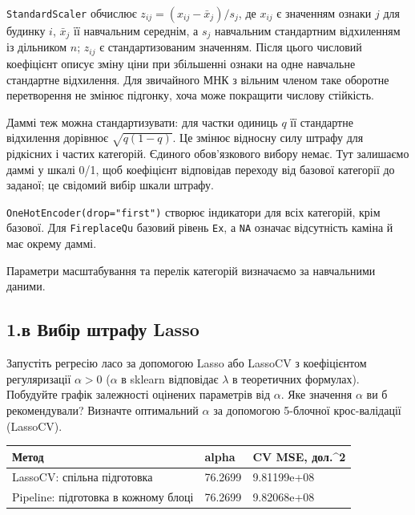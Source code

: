 \texttt{StandardScaler} обчислює \(z_{ij}=(x_{ij}-\bar x_j)/s_j\), де
\(x_{ij}\) є значенням ознаки \(j\) для будинку \(i\), \(\bar x_j\) її
навчальним середнім, а \(s_j\) навчальним стандартним відхиленням із
дільником \(n\); \(z_{ij}\) є стандартизованим значенням. Після цього
числовий коефіцієнт описує зміну ціни при збільшенні ознаки на одне
навчальне стандартне відхилення. Для звичайного МНК з вільним членом
таке оборотне перетворення не змінює підгонку, хоча може покращити
числову стійкість.

Даммі теж можна стандартизувати: для частки одиниць \(q\) її стандартне
відхилення дорівнює \(\sqrt{q(1-q)}\). Це змінює відносну силу штрафу
для рідкісних і частих категорій. Єдиного обов'язкового вибору немає.
Тут залишаємо даммі у шкалі 0/1, щоб коефіцієнт відповідав переходу від
базової категорії до заданої; це свідомий вибір шкали штрафу.

\texttt{OneHotEncoder(drop="first")} створює індикатори для всіх
категорій, крім базової. Для \texttt{FireplaceQu} базовий рівень
\texttt{Ex}, а \texttt{NA} означає відсутність каміна й має окрему
даммі.

Параметри масштабування та перелік категорій визначаємо за навчальними
даними.


\Needspace{411pt}

\subsection{1.в Вибір штрафу Lasso}

\begin{taskstatement}Запустіть регресію ласо за допомогою Lasso або LassoCV з коефіцієнтом
регуляризації \(\alpha > 0\) (\(\alpha\) в sklearn відповідає
\(\lambda\) в теоретичних формулах). Побудуйте графік залежності
оцінених параметрів від \(\alpha\). Яке значення \(\alpha\) ви б
рекомендували? Визначте оптимальний \(\alpha\) за допомогою 5-блочної
крос-валідації (LassoCV).
\end{taskstatement}


\Needspace{56pt}
\begingroup\fontsize{7.5}{9.5}\selectfont\setlength{\tabcolsep}{2.5mm}\renewcommand{\arraystretch}{1.12}\par\noindent\begin{tabular}{|lll|}
\hline
Метод & alpha & CV MSE, дол.\textasciicircum{}2 \\
\hline
Lasso\allowbreak{}CV: спільна підготовка & 76.2699 & 9.81199e+08 \\
Pipeline: підготовка в кожному блоці & 76.2699 & 9.82068e+08 \\
\hline
\end{tabular}
\par\endgroup


